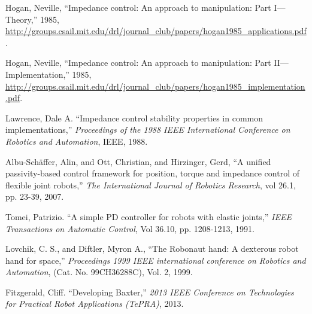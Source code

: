\documentclass[]{article}
\begin{document}
\begin{thebibliography}{10}
 Hogan, Neville, ``Impedance control: An approach to manipulation: Part I—Theory,'' 1985, \url{http://groups.csail.mit.edu/drl/journal_club/papers/hogan1985_applications.pdf}.

 Hogan, Neville, ``Impedance control: An approach to manipulation: Part II—Implementation,'' 1985, \url{http://groups.csail.mit.edu/drl/journal_club/papers/hogan1985_implementation.pdf}.

 Lawrence, Dale A. ``Impedance control stability properties in common implementations,'' \emph{Proceedings of the 1988 IEEE International Conference on Robotics and Automation}, IEEE, 1988.

 Albu-Schäffer, Alin, and Ott, Christian, and Hirzinger, Gerd,  ``A unified passivity-based control framework for position, torque and impedance control of flexible joint robots,'' \emph{The International Journal of Robotics Research}, vol 26.1, pp. 23-39, 2007.

 Tomei, Patrizio. ``A simple PD controller for robots with elastic joints,'' \emph{ IEEE Transactions on Automatic Control}, Vol 36.10, pp. 1208-1213, 1991.

 Lovchik, C. S., and Diftler, Myron A., ``The Robonaut hand: A dexterous robot hand for space,'' \emph{Proceedings 1999 IEEE international conference on Robotics and Automation}, (Cat. No. 99CH36288C), Vol. 2, 1999.

 Fitzgerald, Cliff. ``Developing Baxter,'' \emph{2013 IEEE Conference on Technologies for Practical Robot Applications (TePRA)}, 2013.
\end{thebibliography}
\end{document}
